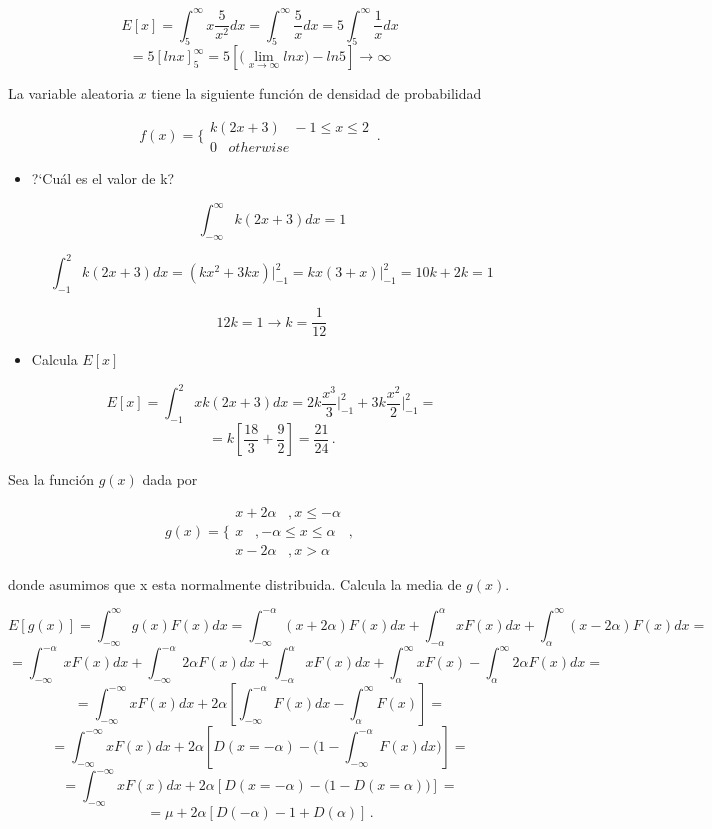 \documentclass[
]{agujournal2019}
\begin{document}
\[E[x]=\int^{\infty}_{5}x\frac{5}{x^2}dx=\int^{\infty}_{5}\frac{5}{x}dx=5\int^{\infty}_{5}\frac{1}{x}dx\]
\[=5[lnx]^{\infty}_5=5\left[\Big(\lim_{x \to\infty} ln{x}\Big)-ln{5}\right]\rightarrow \infty\]

\vspace{0.5cm}

 La variable aleatoria \(x\) tiene la siguiente
función de densidad de probabilidad

\[f(x)=\Bigg\{\begin{array}{c}
          k(2x+3)\,\,\,\,\,-1\le x \le 2 \\ 0 \,\,\,\,\,otherwise
         \end{array} \,.\]

\begin{itemize}
\item ?`Cuál es el valor de k?

$$\int^{\infty}_{-\infty} k(2x+3)dx=1$$

$$\int^{2}_{-1} k(2x+3)dx=(kx^2 +3kx)\Big|^{2}_{-1}=kx(3+x)\Big|^{2}_{-1}=10k+2k=1$$

$$12k=1 \rightarrow k=\frac{1}{12}$$


\item Calcula $E[x]$

$$E[x]=\int^{2}_{-1}x k(2x+3)dx=2k\frac{x^3}{3}\Bigg|^{2}_{-1} + 3k\frac{x^2}{2}\Bigg|^{2}_{-1}=$$
$$=k\left[ \frac{18}{3} + \frac{9}{2}\right]=\frac{21}{24}\,.$$

\end{itemize}

\vspace{0.5cm}

 Sea la función \(g(x)\) dada por

\[g(x)=\Bigg\{\begin{array}{c}
 x+2\alpha\,\,\,\,\,,x\le-\alpha \\
 x \,\,\,\,\,,-\alpha \le x \le \alpha \\
 x-2 \alpha \,\,\,\,\,,x>\alpha
       \end{array} \,,\]

donde asumimos que x esta normalmente distribuida. Calcula la media de
\(g(x)\).

\[E[g(x)]=\int^{\infty}_{-\infty} g(x) F(x) dx=\int^{-\alpha}_{-\infty} (x+2\alpha) F(x) dx +
\int^{\alpha}_{-\alpha} x F(x) dx + \int^{\infty}_{\alpha} (x-2\alpha) F(x) dx=\]
\[=\int^{-\alpha}_{-\infty} x F(x) dx + \int^{-\alpha}_{-\infty} 2 \alpha F(x) dx +
   \int^{\alpha}_{-\alpha} x F(x) dx + \int^{\infty}_{\alpha} x F(x) - \int^{\infty}_{\alpha} 2\alpha F(x)dx=\]
\[=\int^{-\infty}_{-\infty} x F(x) dx +  2\alpha \left[ \int^{-\alpha}_{-\infty} F(x) dx - \int^{\infty}_{\alpha}  F(x)\right]=\]
\[=\int^{-\infty}_{-\infty} x F(x) dx +  2\alpha \left[ D(x=-\alpha) - \Bigg(1-\int^{-\alpha}_{-\infty} F(x) dx\Bigg)\right]=\]
\[=\int^{-\infty}_{-\infty} x F(x) dx +  2\alpha \left[ D(x=-\alpha) - \Bigg(1-D(x=\alpha)\Bigg)\right]=\]
\[=\mu + 2 \alpha \left[ D(-\alpha) - 1 + D(\alpha) \right]\,.\]
\end{document}

